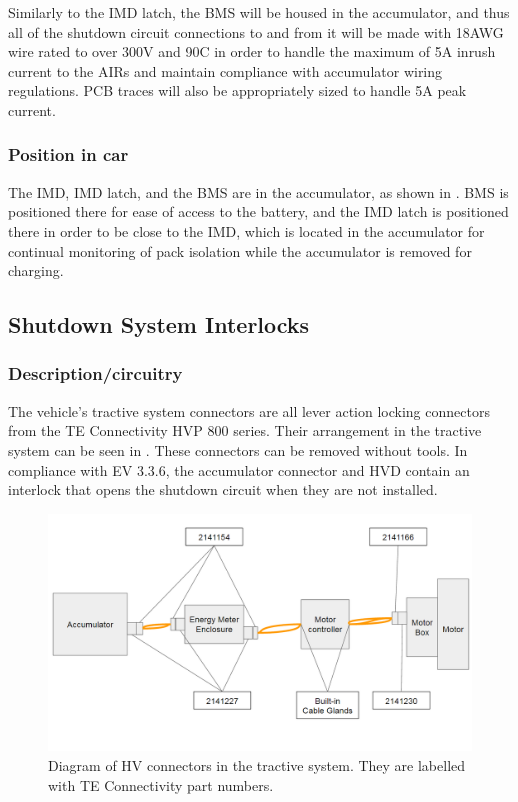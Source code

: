 \documentclass{article}
\begin{document}
Similarly to the IMD latch, the BMS will be housed in the accumulator, and thus all of the shutdown circuit connections to and from it will be made with 18AWG wire rated to over 300V and 90\textdegree C in order to handle the maximum of 5A inrush current to the AIRs and maintain compliance with accumulator wiring regulations. PCB traces will also be appropriately sized to handle 5A peak current. 


\subsubsection{Position in car}
The IMD, IMD latch, and the BMS are in the accumulator, as shown in . BMS is positioned there for ease of access to the battery, and the IMD latch is positioned there in order to be close to the IMD, which is located in the accumulator for continual monitoring of pack isolation while the accumulator is removed for charging. 

\subsection{Shutdown System Interlocks}\label{shutdown_system_interlocks}
\subsubsection{Description/circuitry}
The vehicle's tractive system connectors are all lever action locking connectors from the TE Connectivity HVP 800 series. Their arrangement in the tractive system can be seen in . These connectors can be removed without tools. In compliance with EV 3.3.6, the accumulator connector and HVD contain an interlock that opens the shutdown circuit when they are not installed.

  \begin{figure}[H]
        \centering
        \includegraphics[width=.75\textwidth]{HV_connector_diagram.png}
        \caption{Diagram of HV connectors in the tractive system. They are labelled with TE Connectivity part numbers.}
        \label{fig:HV_connector_diagram}
  \end{figure}
\end{document}
